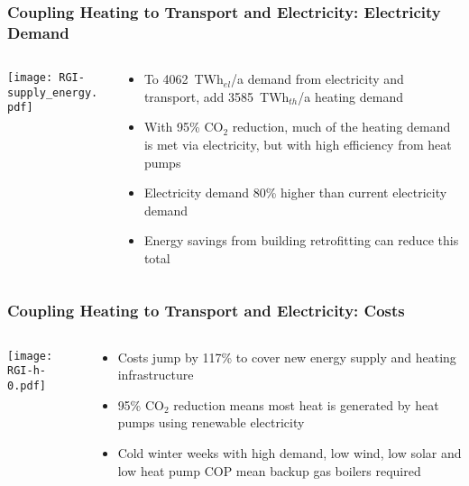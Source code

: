 \documentclass[10pt,aspectratio=169,dvipsnames]{beamer}
\def\co2{CO${}_2$}
\def\el{${}_{el}$}
\def\th{${}_{th}$}
\let\olditem\item
\renewcommand{\item}{%
\olditem\vspace{5pt}}
\begin{document}
\begin{frame}
  \frametitle{Coupling Heating to Transport and Electricity: Electricity Demand}
  \begin{columns}[T]
    \begin{column}{8cm}
      \texttt{[image: RGI-supply\_energy.pdf]}

    \end{column}
    \begin{column}{6cm}
      \begin{itemize}
      \item To 4062~TWh\el/a demand from electricity and transport, add 3585~TWh\th/a heating demand
      \item With 95\% CO$_2$ reduction, much of the heating demand is met via electricity, but with high efficiency from heat pumps
      \item Electricity demand 80\% higher than current electricity demand
      \item Energy savings from building retrofitting can reduce this total
      \end{itemize}
    \end{column}
  \end{columns}
\end{frame}



\begin{frame}
  \frametitle{Coupling Heating to Transport and Electricity: Costs}
  \begin{columns}[T]
    \begin{column}{9cm}
      \texttt{[image: RGI-h-0.pdf]}

    \end{column}
    \begin{column}{5cm}
      \begin{itemize}
      \item Costs jump by 117\% to cover new energy supply and heating infrastructure
      \item 95\% \co2{} reduction means most heat is generated by heat pumps using renewable electricity
      \item Cold winter weeks with high demand, low wind, low solar and low heat pump COP mean backup gas boilers required
      \end{itemize}
    \end{column}
  \end{columns}
\end{frame}
\end{document}

